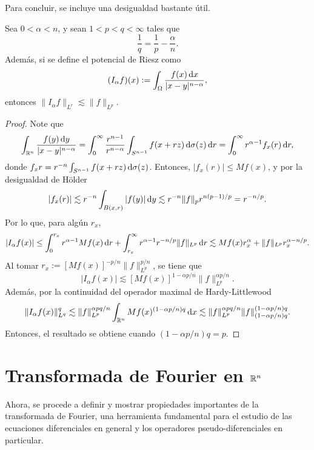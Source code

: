 Para concluir, se incluye una desigualdad bastante útil.
\begin{theorem}
	Sea $0<\alpha<n$, y sean $1<p<q<\infty$ tales que 
	\begin{equation*}
		\frac{1}{q} = \frac{1}{p} - \frac{\alpha}{n}.
	\end{equation*}
	Además, si se define el potencial de Riesz como 
	\begin{equation*}
		(I_\alpha f)(x) := \int_{\Omega} \frac{f(x)\mathop{}\!\mathrm{d} x}{|x-y|^{n-\alpha}},
	\end{equation*}
	entonces $\|I_\alpha f\|_{L^r} \lesssim \|f\|_{L^p}$.
\end{theorem}
\begin{proof}
	Note que 
	\begin{equation*}
		\int_{\mathbb{R}^n} \frac{f(y)\mathop{}\!\mathrm{d} y}{|x-y|^{n-\alpha}} = \int_0^\infty \frac{r^{n-1}}{r^{n-\alpha}}  \int_{S^{n-1}} f(x+rz) \mathop{}\!\mathrm{d} \sigma(z) \mathop{}\!\mathrm{d} r = \int_0^\infty r^{\alpha-1} f_x(r)\mathop{}\!\mathrm{d} r,
	\end{equation*}
	donde $f_xr = r^{-n} \int_{S^{n-1}} f(x+rz) \mathop{}\!\mathrm{d} \sigma(z) $. Entonces, $|f_x(r)| \leq Mf(x)$, y por la desigualdad de Hölder
	\begin{equation*}
		|f_x(r)| \lesssim r^{-n}\int_{B(x, r)}| f(y)|\mathop{}\!\mathrm{d} y \lesssim r^{-n}\|f\|_p r^{n(p-1)/p}  = r^{-n/p}.
	\end{equation*}
	Por lo que, para algún $r_x$,
	\begin{equation*}
		|I_\alpha f(x) |\leq \int_0^{r_x} r^{\alpha-1} Mf(x)\mathop{}\!\mathrm{d} r + \int_{r_x}^\infty r^{\alpha-1}r^{-n/p} \|f\|_{L^p}\mathop{}\!\mathrm{d} r \lesssim Mf(x)r_x^{\alpha} + \|f\|_{L^p}r_x^{\alpha-n/p}.
	\end{equation*}
	Al tomar $r_x := [Mf(x)]^{-p/n}\|f\|_{L^p}^{p/n}$, se tiene que 
	\begin{equation*}
		|I_\alpha f(x) |\lesssim [Mf(x)]^{1 -\alpha p/n} \|f\|_{L^p}^{\alpha p/n}.
	\end{equation*}
	Además, por la continuidad del operador maximal de Hardy-Littlewood
	\begin{equation*}
		\|I_\alpha f(x) \|_{L^q}^q \lesssim \|f\|_{L^p}^{\alpha pq/n} \int_{\mathbb{R}^n}Mf(x)^{(1 -\alpha p/n)q}\mathop{}\!\mathrm{d} x \lesssim  \|f\|_{L^p}^{\alpha pq/n} \|f\|_{(1 -\alpha p/n)q}^{(1 -\alpha p/n)q}.
	\end{equation*}
	Entonces, el resultado se obtiene cuando $(1 -\alpha p/n)q = p$.
\end{proof}
\section{Transformada de Fourier en $\mathbb{R}^n$}
Ahora, se procede a definir y mostrar propiedades importantes de la
transformada de Fourier, una herramienta fundamental para el estudio
de las ecuaciones diferenciales en general y los operadores
pseudo-diferenciales en particular. 

